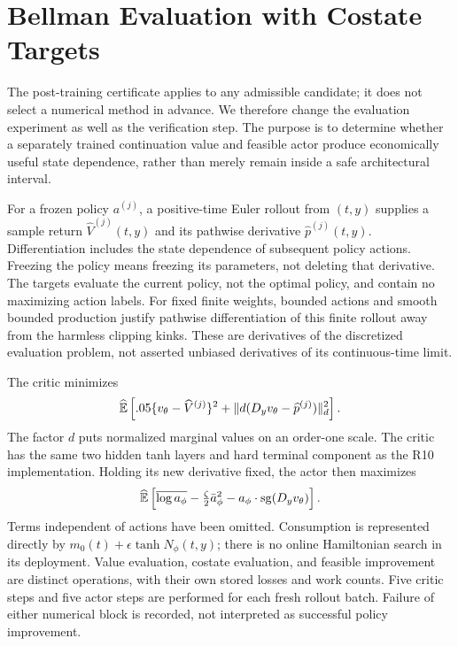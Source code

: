 \section{Bellman Evaluation with Costate Targets}\label{sec:r11learning}
The post-training certificate applies to any admissible candidate; it does not select a numerical method in advance. We therefore change the evaluation experiment as well as the verification step. The purpose is to determine whether a separately trained continuation value and feasible actor produce economically useful state dependence, rather than merely remain inside a safe architectural interval.

For a frozen policy $a^{(j)}$, a positive-time Euler rollout from $(t,y)$ supplies a sample return $\widehat V^{(j)}(t,y)$ and its pathwise derivative $\widehat p^{(j)}(t,y)$. Differentiation includes the state dependence of subsequent policy actions. Freezing the policy means freezing its parameters, not deleting that derivative. The targets evaluate the current policy, not the optimal policy, and contain no maximizing action labels. For fixed finite weights, bounded actions and smooth bounded production justify pathwise differentiation of this finite rollout away from the harmless clipping kinks. These are derivatives of the discretized evaluation problem, not asserted unbiased derivatives of its continuous-time limit.

The critic minimizes
\begin{equation}\label{eq:r11critic}
 \widehat{\mathbb E}\left[
  .05\{v_\theta-\widehat V^{(j)}\}^2+
  \|d(D_yv_\theta-\widehat p^{(j)})\|_d^2\right].
\end{equation}
The factor $d$ puts normalized marginal values on an order-one scale. The critic has the same two hidden tanh layers and hard terminal component as the R10 implementation. Holding its new derivative fixed, the actor then maximizes
\begin{equation}\label{eq:r11actor}
 \widehat{\mathbb E}\left[
 \overline{\log a_\phi}-\tfrac\zeta2\bar a_\phi^2
                          -a_\phi\mathbin{\cdot}\operatorname{sg}(D_yv_\theta)\right].
\end{equation}
Terms independent of actions have been omitted. Consumption is represented directly by $m_0(t)+\epsilon\tanh N_\phi(t,y)$; there is no online Hamiltonian search in its deployment. Value evaluation, costate evaluation, and feasible improvement are distinct operations, with their own stored losses and work counts. Five critic steps and five actor steps are performed for each fresh rollout batch. Failure of either numerical block is recorded, not interpreted as successful policy improvement.

